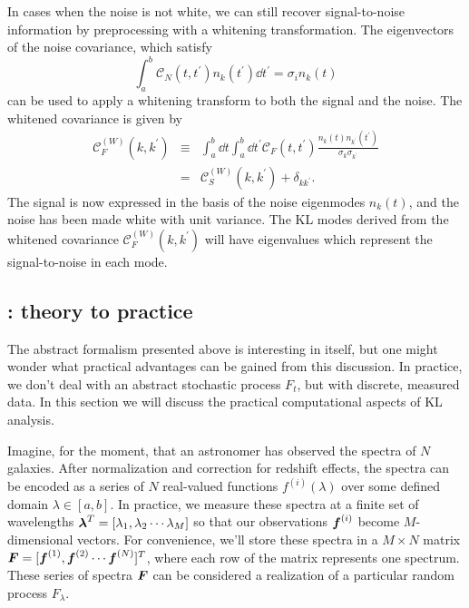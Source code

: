 In cases when the noise is not white, we can still recover signal-to-noise
information by preprocessing with a whitening transformation.  The eigenvectors
of the noise covariance, which satisfy
\begin{equation}
  \int_a^b \mathcal{C}_N(t, t^\prime) n_k(t^\prime) \dd t^\prime 
  = \sigma_i n_k(t)
\end{equation}
can be used to apply a whitening transform to both the signal and the
noise.  The whitened covariance is given by
\begin{eqnarray}
  \mathcal{C}_F^{(W)}(k, k^\prime) &\equiv& \int_a^b\dd t\int_a^b\dd t^\prime
  \mathcal{C}_F(t, t^\prime)
  \frac{n_k(t) n_{k^\prime}(t^\prime)}{\sigma_k\sigma_{k^\prime}}\nonumber\\
  &=& \mathcal{C}_S^{(W)}(k, k^\prime) + \delta_{kk^\prime}.
\end{eqnarray}
The signal is now expressed in the basis of the noise eigenmodes $n_k(t)$,
and the noise has been made white with unit variance.  The KL modes derived
from the whitened covariance $\mathcal{C}_F^{(W)}(k, k^\prime)$ will have
eigenvalues which represent the signal-to-noise in each mode.

\subsection{\KL: theory to practice}
The abstract formalism presented above is interesting in itself, but one
might wonder what practical advantages can be gained from this discussion.
In practice, we don't deal with an abstract stochastic process $F_t$, but
with discrete, measured data.  In this section we will discuss the
practical computational aspects of KL analysis.

Imagine, for the moment, that an astronomer has observed the spectra of
$N$ galaxies.  After normalization and correction for redshift effects,
the spectra can be encoded as a series of $N$ real-valued functions
$f^{(i)}(\lambda)$ over some defined domain $\lambda \in [a, b]$.
In practice, we measure these spectra at a finite set of wavelengths
$\boldsymbol{\lambda}^T = [\lambda_1, \lambda_2 \cdots \lambda_M]$ so that
our observations $\boldsymbol{f}^{(i)}$ become $M$-dimensional vectors.  For
convenience, we'll store these spectra in a $M \times N$ matrix
$\boldsymbol{F} = [\boldsymbol{f}^{(1)}, \boldsymbol{f}^{(2)} \cdots \boldsymbol{f}^{(N)}]^T$,
where each row of the matrix represents one spectrum.
These series of spectra $\boldsymbol{F}$ 
can be considered a realization of a particular
random process $F_\lambda$.

